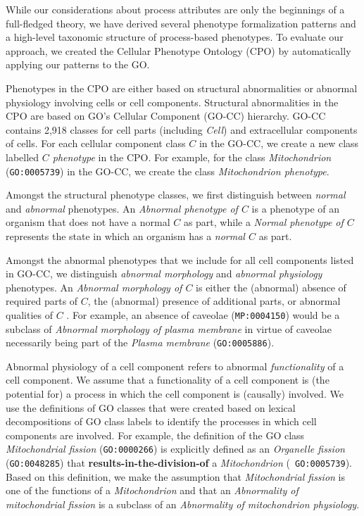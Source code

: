 \documentclass{bioinfo}
\renewcommand{\cite}{\citep}
\begin{document}
While our considerations about process attributes are only the
beginnings of a full-fledged theory, we have derived several phenotype
formalization patterns and a high-level taxonomic structure of
process-based phenotypes. To evaluate our approach, we created the
Cellular Phenotype Ontology (CPO) by automatically applying our
patterns to the GO.

Phenotypes in the CPO are either based on structural abnormalities or
abnormal physiology involving cells or cell components. Structural
abnormalities in the CPO are based on GO's Cellular Component (GO-CC)
hierarchy. GO-CC contains 2,918 classes for cell parts (including {\em
  Cell}) and extracellular components of cells. For each cellular
component class $C$ in the GO-CC, we create a new class labelled {\em
  $C$ phenotype} in the CPO. For example, for the class {\em
  Mitochondrion} ({\tt GO:0005739}) in the GO-CC, we create the class
{\em Mitochondrion phenotype}.

Amongst the structural phenotype classes, we first distinguish between
{\em normal} and {\em abnormal} phenotypes. An {\em Abnormal phenotype
  of $C$} is a phenotype of an organism that does not have a normal
$C$ as part, while a {\em Normal phenotype of $C$} represents the
state in which an organism has a {\em normal $C$} as part.

Amongst the abnormal phenotypes that we include for all cell
components listed in GO-CC, we distinguish {\em abnormal morphology}
and {\em abnormal physiology} phenotypes. An {\em Abnormal morphology
  of $C$} is either the (abnormal) absence of required parts of $C$,
the (abnormal) presence of additional parts, or abnormal qualities of
$C$ \cite{Hoehndorf2010phene}. For example, an absence of caveolae
({\tt MP:0004150}) would be a subclass of {\em Abnormal morphology of
  plasma membrane} in virtue of caveolae necessarily being part of the
{\em Plasma membrane} ({\tt GO:0005886}).

Abnormal physiology of a cell component refers to abnormal {\em
  functionality} of a cell component. We assume that a functionality
of a cell component is (the potential for) a process in which the cell
component is (causally) involved. We use the definitions of GO classes
that were created based on lexical decompositions of GO class labels
\cite{Mungall2010go, Bada2007a, Ogren2004} to identify the processes
in which cell components are involved. For example, the definition of
the GO class {\em Mitochondrial fission} ({\tt GO:0000266}) is
explicitly defined as an {\em Organelle fission} ({\tt GO:0048285})
that {\bf results-in-the-division-of} a {\em Mitochondrion} ({\tt
  GO:0005739}). Based on this definition, we make the assumption that
{\em Mitochondrial fission} is one of the functions of a {\em
  Mitochondrion} and that an {\em Abnormality of mitochondrial
  fission} is a subclass of an {\em Abnormality of mitochondrion
  physiology}.
\end{document}
